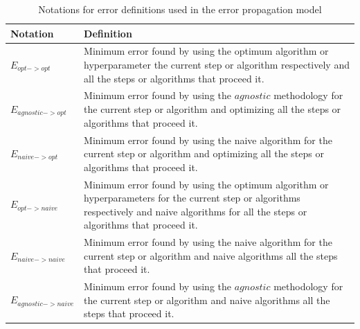 \begin{table}[H]
\centering
\caption{Notations for error definitions used in the error propagation model}
\begin{tabular}{ |m{6em}|m{10cm}| } 
 \hline
 Notation & Definition \\ 
 \hline
 $E_{opt->opt}$ & Minimum error found by using the optimum algorithm or hyperparameter the current step or algorithm respectively and all the steps or algorithms that proceed it. \\ 
 \hline
 $E_{agnostic->opt}$ & Minimum error found by using the $agnostic$ methodology for the current step or algorithm and optimizing all the steps or algorithms that proceed it. \\ 
 \hline
  $E_{naive->opt}$ & Minimum error found by using the naive algorithm for the current step or algorithm and optimizing all the steps or algorithms that proceed it. \\ 
 \hline
 $E_{opt->naive}$ & Minimum error found by using the optimum algorithm or hyperparameters for the current step or algorithms respectively and naive algorithms for all the steps or algorithms that proceed it. \\ 
 \hline
 $E_{naive->naive}$ & Minimum error found by using the naive algorithm for the current step or algorithm and naive algorithms all the steps that proceed it. \\ 
 \hline
 $E_{agnostic->naive}$ & Minimum error found by using the $agnostic$ methodology for the current step or algorithm and naive algorithms all the steps that proceed it.\\ 
 \hline
 \end{tabular}
\label{table:1}
\end{table}


